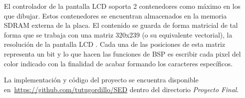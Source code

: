 El controlador de la pantalla LCD soporta 2 contenedores como m\'aximo
en los que dibujar. Estos contenedores se encuentran almacenados en la
memoria SDRAM externa de la placa. El contenido se guarda de forma
matricial de tal forma que se trabaja con una matriz 320x239 (o su
equivalente vectorial), la
resoluci\'on de la pantalla LCD . Cada una de las posiciones de esta
matriz representa un bit y lo que hacen las funciones de BSP es
escribir cada pixel del color indicado con la finalidad de acabar
formando los caracteres espec\'ificos.

La implementaci\'on y c\'odigo del proyecto se encuentra disponible en~\url{https://github.com/tutugordillo/SED} dentro del directorio
\emph{Proyecto Final}.  
